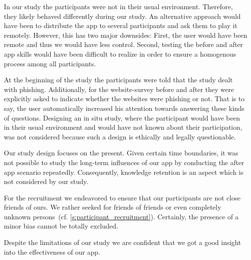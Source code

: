 \begin{description}[leftmargin=0cm]
	\item[Behavior Change:] In our study the participants were not in their usual environment. 
	Therefore, they likely behaved differently during our study.
	An alternative approach would have been to distribute the app to several participants and ask them to play it remotely.
	However, this has two major downsides: First, the user would have been remote and thus we would have less control.
	Second, testing the before and after app skills would have been difficult to realize in order to ensure a homogenous process among all participants.
	\item[Increased Attention:] At the beginning of the study the participants were told that the study dealt with phishing.
	Additionally, for the website-survey before and after they were explicitly asked to indicate whether the websites were phishing or not.
	That is to say, the user automatically increased his attention towards answering these kinds of questions.
	Designing an in situ study, where the participant would have been in their usual environment and would have not known about their participation, was not considered because such a design is ethically and legally questionable. 
	\item[Knowledge Retention:] Our study design focuses on the present.
	Given certain time boundaries, it was not possible to study the long-term influences of our app by conducting the after app scenario repeatedly. 
	Consequently, knowledge retention is an aspect which is not considered by our study.
	\item[Bias:] For the recruitment we endeavored to ensure that our participants are not close friends of ours. 
	We rather seeked for friends of friends or even completely unknown persons~(cf. \autoref{s:participant_recruitment}).
	Certainly, the presence of a minor bias cannot be totally excluded.
\end{description}
Despite the limitations of our study we are confident that we got a good insight into the effectiveness of our app.

